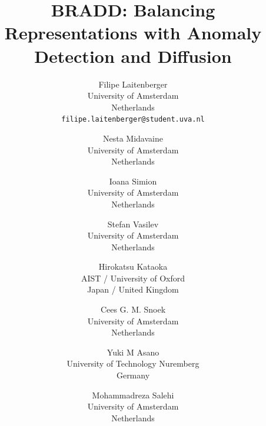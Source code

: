 \documentclass[10pt,twocolumn,letterpaper]{article}
\title{BRADD: \textbf{B}alancing \textbf{R}epresentations with \textbf{A}nomaly \textbf{D}etection and \textbf{D}iffusion}
\author{Filipe Laitenberger\\
University of Amsterdam\\
Netherlands\\
{\tt\small filipe.laitenberger@student.uva.nl}\\
\and
Nesta Midavaine\\
University of Amsterdam\\
Netherlands\\
\and
Ioana Simion\\
University of Amsterdam\\
Netherlands\\
\and
Stefan Vasilev\\
University of Amsterdam\\
Netherlands\\
\and
Hirokatsu Kataoka\\
AIST / University of Oxford\\
Japan / United Kingdom\\
\and
Cees G. M. Snoek\\
University of Amsterdam\\
Netherlands\\
\and
Yuki M Asano\\
University of Technology Nuremberg\\
Germany\\
\and
Mohammadreza Salehi\\
University of Amsterdam\\
Netherlands\\
}
\begin{document}
\maketitle
    





{
    \small
    
    
}

% 
\end{document}
